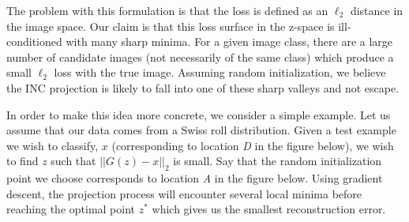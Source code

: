 \documentclass[twoside]{article}
\theoremstyle{definition}
\begin{document}
The problem with this formulation is that the loss is defined as an $\ell_2$ distance in the image space. Our claim is that this loss surface in the z-space is ill-conditioned with many sharp minima. For a given image class, there are a large number of candidate images (not necessarily of the same class) which produce a small $\ell_2$ loss with the true image. Assuming random initialization, we believe the INC projection is likely to fall into one of these sharp valleys and not escape.

In order to make this idea more concrete, we consider a simple example. Let us assume that our data comes from a Swiss roll distribution. Given a test example we wish to classify, $x$ (corresponding to location \emph{D} in the figure below), we wish to find $z$ such that $||G(z) - x||_2$ is small. Say that the random initialization point we choose corresponds to location \emph{A} in the figure below. Using gradient descent, the projection process will encounter several local minima before reaching the optimal point $z^*$ which gives us the smallest reconstruction error.
\end{document}
